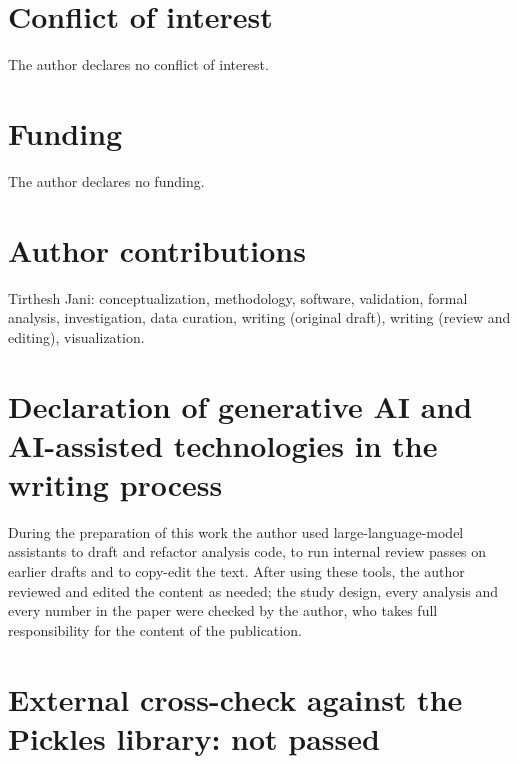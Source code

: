 \documentclass[11pt,a4paper]{article}
\begin{document}
\section*{Conflict of interest}

The author declares no conflict of interest.

\section*{Funding}

The author declares no funding.

\section*{Author contributions}

Tirthesh Jani: conceptualization, methodology, software, validation, formal analysis, investigation, data curation, writing (original draft), writing (review and editing), visualization.

\section*{Declaration of generative AI and AI-assisted technologies in the writing process}

During the preparation of this work the author used large-language-model assistants to draft and refactor analysis code, to run internal review passes on earlier drafts and to copy-edit the text. After using these tools, the author reviewed and edited the content as needed; the study design, every analysis and every number in the paper were checked by the author, who takes full responsibility for the content of the publication.




\appendix

\section{External cross-check against the Pickles library: not passed}
\label{app:pickles}
\end{document}
